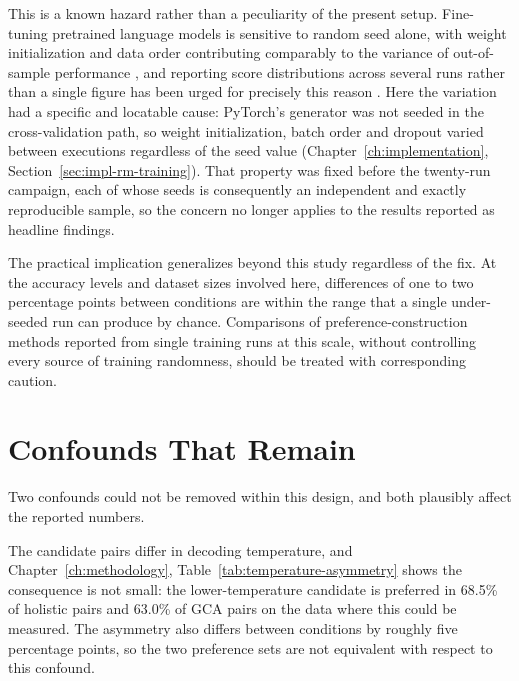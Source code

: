 This is a known hazard rather than a peculiarity of the present setup.
Fine-tuning pretrained language models is sensitive to random seed alone, with
weight initialization and data order contributing comparably to the variance of
out-of-sample performance \citep{dodge2020finetuning}, and reporting score
distributions across several runs rather than a single figure has been urged for
precisely this reason \citep{reimers2017reporting}. Here the variation had a
specific and locatable cause: PyTorch's generator was not seeded in the
cross-validation path, so weight initialization, batch order and dropout varied
between executions regardless of the seed value
(Chapter~\ref{ch:implementation}, Section~\ref{sec:impl-rm-training}). That
property was fixed before the twenty-run campaign, each of whose seeds is
consequently an independent and exactly reproducible sample, so the concern no
longer applies to the results reported as headline findings.

The practical implication generalizes beyond this study regardless of the fix.
At the accuracy levels and dataset sizes involved here, differences of one to two
percentage points between conditions are within the range that a single
under-seeded run can produce by chance. Comparisons of preference-construction
methods reported from single training runs at this scale, without controlling
every source of training randomness, should be treated with corresponding
caution.


\section{Confounds That Remain}
\label{sec:disc-confounds}

Two confounds could not be removed within this design, and both plausibly affect
the reported numbers.

The candidate pairs differ in decoding temperature, and
Chapter~\ref{ch:methodology}, Table~\ref{tab:temperature-asymmetry} shows the
consequence is not small: the lower-temperature candidate is preferred in 68.5\%
of holistic pairs and 63.0\% of GCA pairs on the data where this could be
measured. The asymmetry also differs between conditions by roughly five
percentage points, so the two preference sets are not equivalent with respect to
this confound.

